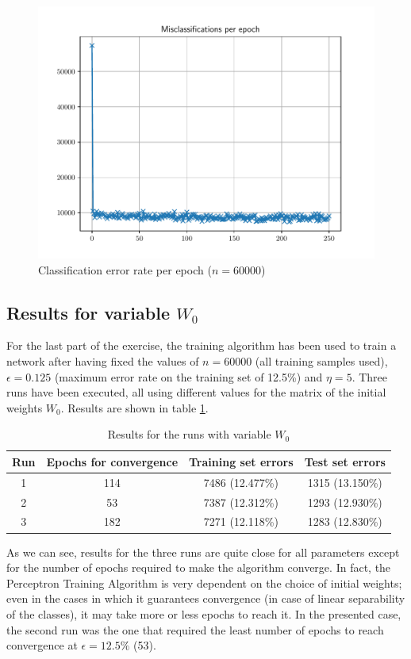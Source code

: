\documentclass[letterpaper,headings=standardclasses]{scrartcl}
\begin{document}
\begin{figure}[h]
\centering
\includegraphics[width=.7\linewidth]{errors_60000.pdf}
\caption{Classification error rate per epoch ($n = 60000$)}
\label{errors_60000}
\end{figure}

\subsection{Results for variable $W_0$}

For the last part of the exercise, the training algorithm has been used to train a network after having fixed the values of $n = 60000$ (all training samples used), $\epsilon = 0.125$ (maximum error rate on the training set of 12.5\%) and $\eta = 5$. Three runs have been executed, all using different values for the matrix of the initial weights $W_0$. Results are shown in table \ref{results_varw}.

\begin{table}[h]
\centering
\begin{tabular}{|c|c|c|c|}
\hline
Run   & Epochs for convergence & Training set errors & Test set errors \\ \hline
1     & 114 & 7486 (12.477\%) & 1315 (13.150\%) \\ \hline
2     & 53  & 7387 (12.312\%) & 1293 (12.930\%) \\ \hline
3     & 182 & 7271 (12.118\%) & 1283 (12.830\%) \\ \hline
\end{tabular}
\caption{Results for the runs with variable $W_0$}
\label{results_varw}
\end{table}

As we can see, results for the three runs are quite close for all parameters except for the number of epochs required to make the algorithm converge. In fact, the Perceptron Training Algorithm is very dependent on the choice of initial weights; even in the cases in which it guarantees convergence (in case of linear separability of the classes), it may take more or less epochs to reach it. In the presented case, the second run was the one that required the least number of epochs to reach convergence at $\epsilon = 12.5\%$ (53).
\end{document}
